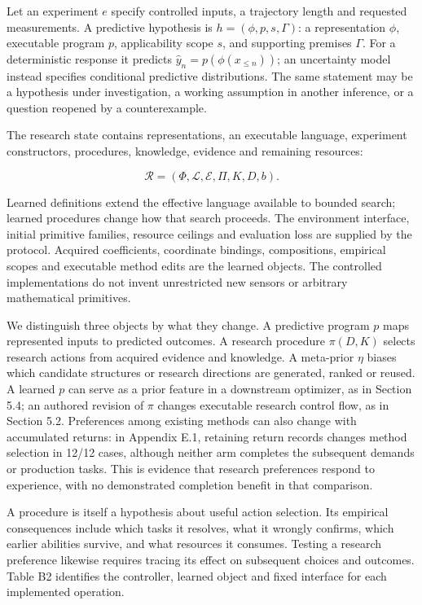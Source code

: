 \documentclass[11pt,a4paper]{article}
\begin{document}
Let an experiment \(e\) specify controlled inputs, a trajectory length and requested measurements. A predictive hypothesis is \(h=(\phi,p,s,\Gamma)\): a representation \(\phi\), executable program \(p\), applicability scope \(s\), and supporting premises \(\Gamma\). For a deterministic response it predicts \(\hat y_n=p(\phi(x_{\leq n}))\); an uncertainty model instead specifies conditional predictive distributions. The same statement may be a hypothesis under investigation, a working assumption in another inference, or a question reopened by a counterexample.


The research state contains representations, an executable language, experiment constructors, procedures, knowledge, evidence and remaining resources:


\[
\mathcal R=(\Phi,\mathcal L,\mathcal E,\Pi,K,D,b).
\]


Learned definitions extend the effective language available to bounded search; learned procedures change how that search proceeds. The environment interface, initial primitive families, resource ceilings and evaluation loss are supplied by the protocol. Acquired coefficients, coordinate bindings, compositions, empirical scopes and executable method edits are the learned objects. The controlled implementations do not invent unrestricted new sensors or arbitrary mathematical primitives.


We distinguish three objects by what they change. A predictive program \(p\) maps represented inputs to predicted outcomes. A research procedure \(\pi(D,K)\) selects research actions from acquired evidence and knowledge. A meta-prior \(\eta\) biases which candidate structures or research directions are generated, ranked or reused. A learned \(p\) can serve as a prior feature in a downstream optimizer, as in Section 5.4; an authored revision of \(\pi\) changes executable research control flow, as in Section 5.2. Preferences among existing methods can also change with accumulated returns: in Appendix E.1, retaining return records changes method selection in 12/12 cases, although neither arm completes the subsequent demands or production tasks. This is evidence that research preferences respond to experience, with no demonstrated completion benefit in that comparison.


A procedure is itself a hypothesis about useful action selection. Its empirical consequences include which tasks it resolves, what it wrongly confirms, which earlier abilities survive, and what resources it consumes. Testing a research preference likewise requires tracing its effect on subsequent choices and outcomes. Table B2 identifies the controller, learned object and fixed interface for each implemented operation.
\end{document}
